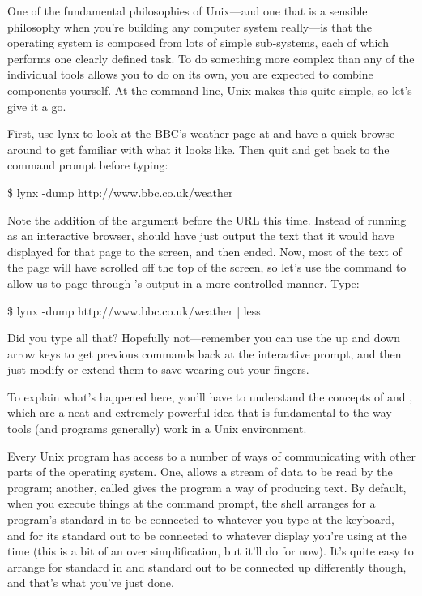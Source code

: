 One of the fundamental philosophies of Unix---and one that is a sensible philosophy when you're building any computer system really---is that the operating system is composed from lots of simple sub-systems, each of which performs one clearly defined task. To do something more complex than any of the individual tools allows you to do on its own, you are expected to combine components yourself. At the command line, Unix makes this quite simple, so let's give it a go. 

First, use lynx to look at the BBC's weather page at  and have a quick browse around to get familiar with what it looks like. Then quit  and get back to the command prompt before typing:

\begin{ttoutenv}
\$ lynx -dump http://www.bbc.co.uk/weather
\end{ttoutenv}

Note the addition of the  argument before the URL this time. Instead of running as an interactive browser,  should have just output the text that it would have displayed for that page to the screen, and then ended. Now, most of the text of the page will have scrolled off the top of the screen, so let's use the  command to allow us to page through 's output in a more controlled manner. Type:

\begin{ttoutenv}
\$ lynx -dump http://www.bbc.co.uk/weather | less
\end{ttoutenv}

Did you type all that? Hopefully not---remember you can use the up and down arrow keys to get previous commands back at the interactive prompt, and then just modify or extend them to save wearing out your fingers.

To explain what's happened here, you'll have to understand the concepts of  and , which are a neat and extremely powerful idea that is fundamental to the way tools (and programs generally) work in a Unix environment. 

Every Unix program has access to a number of ways of communicating with other parts of the operating system. One,  allows a stream of data to be read by the program; another, called  gives the program a way of producing text. By default, when you execute things at the command prompt, the shell arranges for a program's standard in to be connected to whatever you type at the keyboard, and for its standard out to be connected to whatever display you're using at the time (this is a bit of an over simplification, but it'll do for now). It's quite easy to arrange for standard in and standard out to be connected up differently though, and that's what you've just done.

